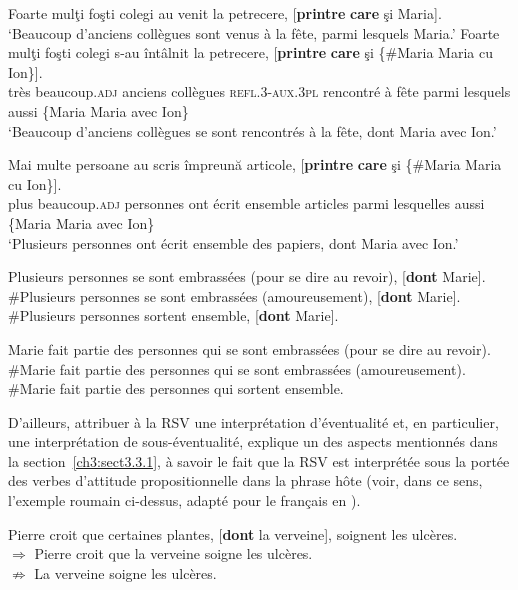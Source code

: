\ea \label{ch3:ex81}
\ea 
Foarte mulţi foşti colegi au venit la petrecere, [\textbf{printre} \textbf{care} şi Maria]. \label{ch3:ex81a}\\
\glt ‘Beaucoup d’anciens collègues sont venus à la fête, parmi lesquels Maria.’
\ex 
\gll Foarte  mulţi  foşti  colegi  s-au  întâlnit  la  petrecere,  [\textbf{printre} \textbf{care}  şi  \{\#Maria  {\textbar}  Maria  cu  Ion\}]. \label{ch3:ex81b}\\
très  beaucoup.\textsc{adj}  anciens  collègues  \textsc{refl.3-aux.3pl}  rencontré  à  fête parmi  lesquels  aussi  \{Maria  {\textbar}  Maria  avec  Ion\} \\
\glt ‘Beaucoup d’anciens collègues se sont rencontrés à la fête, dont Maria avec Ion.’

\ex 
\gll Mai  multe  persoane  au  scris  împreună  articole,  [\textbf{printre} \textbf{care} şi  \{\#Maria  {\textbar}  Maria  cu  Ion\}]. \label{ch3:ex81c}\\
plus  beaucoup.\textsc{adj}  personnes  ont  écrit  ensemble  articles  parmi  lesquelles aussi  \{Maria  {\textbar}  Maria  avec  Ion\} \\
\glt ‘Plusieurs personnes ont écrit ensemble des papiers, dont Maria avec Ion.’
\z 
\z 


\ea \label{ch3:ex82}
\ea 
Plusieurs personnes se sont embrassées (pour se dire au revoir), [\textbf{dont} Marie]. \label{ch3:ex82a} 
\ex
\#Plusieurs personnes se sont embrassées (amoureusement), [\textbf{dont} Marie]. \label{ch3:ex82b}
\ex 
\#Plusieurs personnes sortent ensemble, [\textbf{dont} Marie]. \label{ch3:ex82c}
\z 
\z

\ea \label{ch3:ex83}
\ea 
Marie fait partie des personnes qui se sont embrassées (pour se dire au revoir).
\ex
\#Marie fait partie des personnes qui se sont embrassées (amoureusement).
\ex 
\#Marie fait partie des personnes qui sortent ensemble.
\z 
\z 

D’ailleurs, attribuer à la RSV une interprétation d’éventualité et, en particulier, une interprétation de sous-éventualité, explique un des aspects mentionnés dans la section~\ref{ch3:sect3.3.1}, à savoir le fait que la RSV est interprétée sous la portée des verbes d’attitude propositionnelle dans la phrase hôte (voir, dans ce sens, l’exemple roumain  ci-dessus, adapté pour le français en ).

\ea \label{ch3:ex84}
\ea 
Pierre croit que certaines plantes, [\textbf{dont} la verveine], soignent les ulcères.\\
\ex
${\Rightarrow}$ Pierre croit que la verveine soigne les ulcères.\\
\ex 
${\nRightarrow}$ La verveine soigne les ulcères.
\z 
\z


